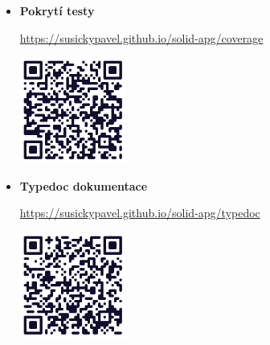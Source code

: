 \begin{itemize}
      \item \textbf{Pokrytí testy}

            \url{https://susickypavel.github.io/solid-apg/coverage}

            \includegraphics[width=0.275\textwidth]{assets/figures/qr/coverage.png}

      \item \textbf{Typedoc dokumentace}

            \url{https://susickypavel.github.io/solid-apg/typedoc}

            \includegraphics[width=0.275\textwidth]{assets/figures/qr/typedoc.png}

\end{itemize}
